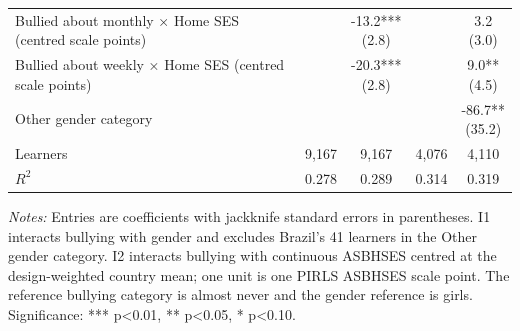 \begin{table}[H]
{\begin{tabular}{lcccc}
Bullied about monthly × Home SES (centred scale points) &  & \shortstack{-13.2***\\(2.8)} &  & \shortstack{3.2\\(3.0)} \\
Bullied about weekly × Home SES (centred scale points) &  & \shortstack{-20.3***\\(2.8)} &  & \shortstack{9.0**\\(4.5)} \\
Other gender category &  &  &  & \shortstack{-86.7**\\(35.2)} \\
\midrule
Learners & 9,167 & 9,167 & 4,076 & 4,110 \\
$R^{2}$ & 0.278 & 0.289 & 0.314 & 0.319 \\
\bottomrule
\end{tabular}%
}
\parbox{0.98\textwidth}{\footnotesize \textit{Notes:} Entries are coefficients with jackknife standard errors in parentheses. I1 interacts bullying with gender and excludes Brazil's 41 learners in the Other gender category. I2 interacts bullying with continuous ASBHSES centred at the design-weighted country mean; one unit is one PIRLS ASBHSES scale point. The reference bullying category is almost never and the gender reference is girls. Significance: *** p\textless{}0.01, ** p\textless{}0.05, * p\textless{}0.10.}
\end{table}
